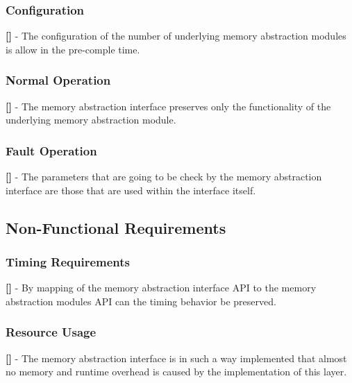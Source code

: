 \subsubsection{Configuration}
{\bf []} - The configuration of the number of underlying memory abstraction modules is allow in the pre-comple time.
\subsubsection{Normal Operation}
{\bf []} - The memory abstraction interface preserves only the functionality of the underlying memory abstraction module.
\subsubsection{Fault Operation}
{\bf []} - The parameters that are going to be check by the memory abstraction interface are those that are used within the interface itself.
\subsection{Non-Functional Requirements}
\subsubsection{Timing Requirements}
{\bf []} - By mapping of the memory abstraction interface API to the memory abstraction modules API can the timing behavior be preserved.
\subsubsection{Resource Usage}
{\bf []} - The memory abstraction interface is in such a way implemented that almost no memory and runtime overhead is caused by the implementation of this layer.



